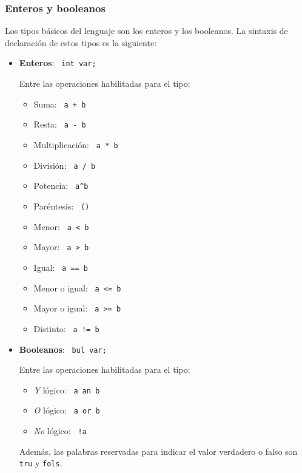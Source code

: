 \documentclass[10pt,a4paper]{article}
\begin{document}
\subsubsection{Enteros y booleanos}
Los tipos básicos del lenguaje son los enteros y los booleanos. La sintaxis de declaración de estos tipos es la siguiente:
\begin{itemize}
    \item \textbf{Enteros}: \texttt{\color{blue} int var;}
    
    Entre las operaciones habilitadas para el tipo:
    \begin{itemize}
        \item Suma: \texttt{\color{blue} a + b}
        \item Resta: \texttt{\color{blue} a - b}
        \item Multiplicación: \texttt{\color{blue} a * b}
        \item División: \texttt{\color{blue} a / b}
        \item Potencia: \texttt{\color{blue} a\^{}b}
        \item Paréntesis: \texttt{\color{blue} ()}
        \item Menor: \texttt{\color{blue} a \textless{} b}
        \item Mayor: \texttt{\color{blue} a \textgreater{} b}
        \item Igual: \texttt{\color{blue} a == b}
        \item Menor o igual: \texttt{\color{blue} a \textless{}= b}
        \item Mayor o igual: \texttt{\color{blue} a \textgreater{}= b}
        \item Distinto: \texttt{\color{blue} a != b}
    \end{itemize}
    \item \textbf{Booleanos}: \texttt{\color{blue} bul var;}
    
    Entre las operaciones habilitadas para el tipo:
    \begin{itemize}
        \item \textit{Y} lógico: \texttt{\color{blue} a an b}
        \item \textit{O} lógico: \texttt{\color{blue} a or b}
        \item \textit{No} lógico: \texttt{\color{blue} !a}
    \end{itemize}
    Además, las palabras reservadas para indicar el valor verdadero o falso son \texttt{\color{blue}tru} y \texttt{\color{blue}fols}.
\end{itemize}
\end{document}
